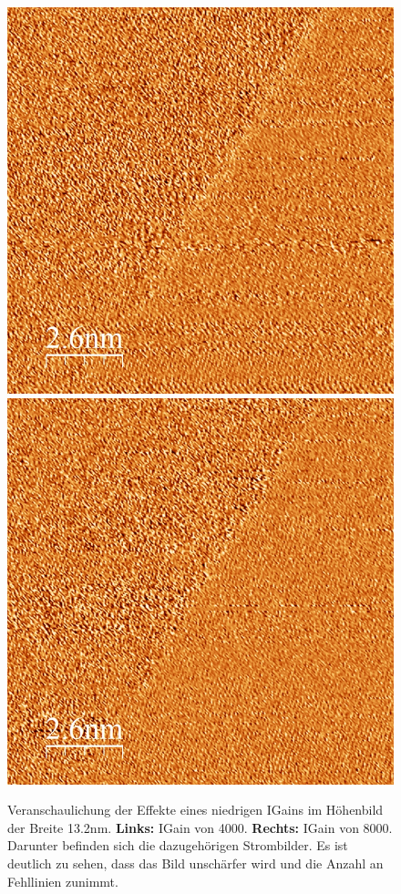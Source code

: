 \documentclass[12pt,a4paper]{article}
\begin{document}
\begin{figure}
\includegraphics[scale=0.3]{Bilder/Igain4000_Strom.jpg}
\includegraphics[scale=0.3]{Bilder/Igain8000_Strom.jpg}
\caption{Veranschaulichung der Effekte eines niedrigen IGains im Höhenbild der Breite 13.2nm. \textbf{Links:} IGain von 4000.  \textbf{Rechts:} IGain von 8000. Darunter befinden sich die dazugehörigen Strombilder. Es ist deutlich zu sehen, dass das Bild unschärfer wird und die Anzahl an Fehllinien zunimmt.}
\label{fig:Igain}
\end{figure}
\end{document}
